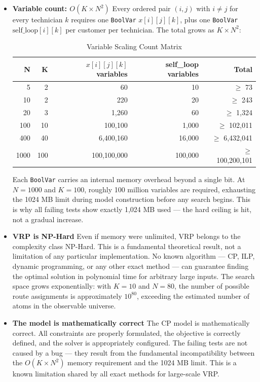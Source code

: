 \documentclass[11pt]{article}
\begin{document}
\begin{itemize}
    \item \textbf{Variable count: \texorpdfstring{$O(K \times N^2)$}{O(K x N²)}}\newline
    Every ordered pair $(i, j)$ with $i \neq j$ for every technician $k$ requires one \texttt{BoolVar} $x[i][j][k]$, plus one \texttt{BoolVar} $\text{self\_loop}[i][k]$ per customer per technician. The total grows as $K \times N^2$:
    
    \begin{table}[h]
    \centering
    \caption{Variable Scaling Count Matrix}
    \begin{tabular}{rrrrr}
    \toprule
    \textbf{N} & \textbf{K} & \textbf{$x[i][j][k]$ variables} & \textbf{self\_loop variables} & \textbf{Total} \\
    \midrule
    5 & 2 & 60 & 10 & $\ge$ 73 \\
    10 & 2 & 220 & 20 & $\ge$ 243 \\
    20 & 3 & 1,260 & 60 & $\ge$ 1,324 \\
    100 & 10 & 100,100 & 1,000 & $\ge$ 102,011 \\
    400 & 40 & 6,400,160 & 16,000 & $\ge$ 6,432,041 \\
    1000 & 100 & 100,100,000 & 100,000 & $\ge$ 100,200,101 \\
    \bottomrule
    \end{tabular}
    \end{table}
    
    Each \texttt{BoolVar} carries an internal memory overhead beyond a single bit. At $N=1000$ and $K=100$, roughly 100 million variables are required, exhausting the 1024 MB limit during model construction before any search begins. This is why all failing tests show exactly 1,024 MB used — the hard ceiling is hit, not a gradual increase.

    \item \textbf{VRP is NP-Hard} \newline
    Even if memory were unlimited, VRP belongs to the complexity class NP-Hard. This is a fundamental theoretical result, not a limitation of any particular implementation. No known algorithm — CP, ILP, dynamic programming, or any other exact method — can guarantee finding the optimal solution in polynomial time for arbitrary large inputs. The search space grows exponentially: with $K=10$ and $N=80$, the number of possible route assignments is approximately $10^{80}$, exceeding the estimated number of atoms in the observable universe.


    \item \textbf{The model is mathematically correct} \newline
    The CP model is mathematically correct. All constraints are properly formulated, the objective is correctly defined, and the solver is appropriately configured. The failing tests are not caused by a bug — they result from the fundamental incompatibility between the $O(K \times N^2)$ memory requirement and the 1024 MB limit. This is a known limitation shared by all exact methods for large-scale VRP.
\end{itemize}
\end{document}
